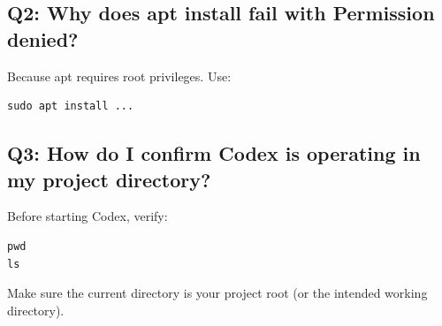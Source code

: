 \documentclass[11pt,a4paper]{article}
\begin{document}
\subsection*{Q2: Why does apt install fail with Permission denied?}
Because apt requires root privileges. Use:
\begin{lstlisting}
sudo apt install ...
\end{lstlisting}

\subsection*{Q3: How do I confirm Codex is operating in my project directory?}
Before starting Codex, verify:
\begin{lstlisting}
pwd
ls
\end{lstlisting}
Make sure the current directory is your project root (or the intended working directory).
\end{document}
